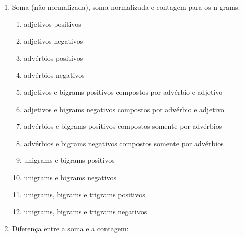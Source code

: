 \documentclass[template.tex]{subfiles}
\begin{document}
\begin{enumerate}
  \item Soma (não normalizada), soma normalizada e contagem para os n-grams:
  \begin{enumerate}
     \item adjetivos positivos
     \item adjetivos negativos
     \item advérbios positivos
     \item advérbios negativos
     
     
     \item adjetivos e bigrams positivos compostos por advérbio e adjetivo
     \item adjetivos e bigrams negativos compostos por advérbio e adjetivo
     \item advérbios e bigrams positivos compostos somente por advérbios
	 \item advérbios e bigrams negativos compostos somente por advérbios
	 \item unigrams e bigrams positivos
	 \item unigrams e bigrams negativos
	 \item unigrams, bigrams e trigrams positivos 
	 \item unigrams, bigrams e trigrams negativos
  \end{enumerate}
  \item Diferença entre a soma e a contagem: 
  

\end{enumerate}
\end{document}

